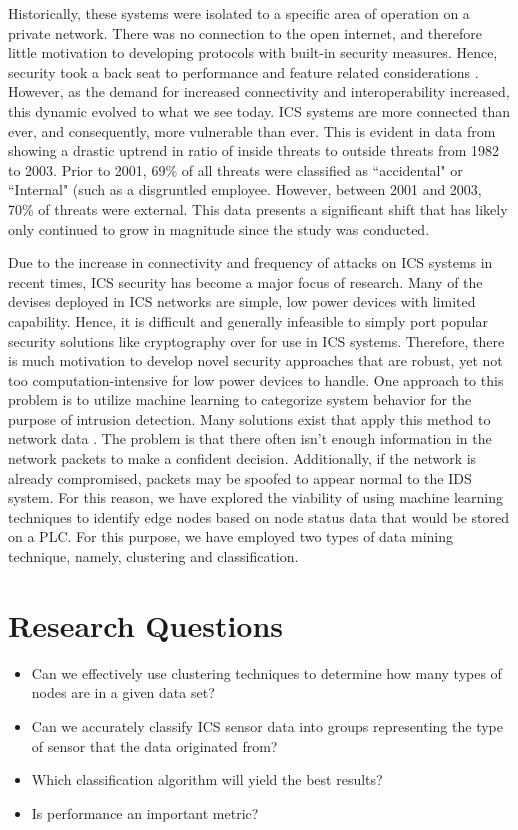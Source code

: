 \documentclass[letterpaper, 10 pt, conference]{ieeeconf}  %
\begin{document}
Historically, these systems were isolated to a specific area of operation on a private network. There was no connection to the open internet, and therefore little motivation to developing protocols with built-in security measures. Hence, security took a back seat to performance and feature related considerations \cite{igure2006security}. However, as the demand for increased connectivity and interoperability increased, this dynamic evolved to what we see today. ICS systems are more connected than ever, and consequently, more vulnerable than ever. This is evident in data from \cite{byres2004myths} showing a drastic uptrend in ratio of inside threats to outside threats from 1982 to 2003. Prior to 2001, 69\% of all threats were classified as ``accidental" or ``Internal" (such as a disgruntled employee. However, between 2001 and 2003, 70\% of threats were external. This data presents a significant shift that has likely only continued to grow in magnitude since the study was conducted.

Due to the increase in connectivity and frequency of attacks on ICS systems in recent times, ICS security has become a major focus of research. Many of the devises deployed in ICS networks are simple, low power devices with limited capability. Hence, it is difficult and generally infeasible to simply port popular security solutions like cryptography over for use in ICS systems. Therefore, there is much motivation to develop novel security approaches that are robust, yet not too computation-intensive for low power devices to handle. 
One approach to this problem is to utilize machine learning to categorize system behavior for the purpose of intrusion detection. Many solutions exist that apply this method to network data \cite{ponomarev2015industrial, schuster2013towards, feng2017multi, terai2017cyber, hijazi2018deep}. The problem is that there often isn't enough information in the network packets to make a confident decision. Additionally, if the network is already compromised, packets may be spoofed to appear normal to the IDS system. For this reason, we have explored the viability of using machine learning techniques to identify edge nodes based on node status data that would be stored on a PLC. For this purpose, we have employed two types of data mining technique, namely, clustering and classification.


\section{Research Questions}
\begin{itemize}
    \item Can we effectively use clustering techniques to determine how many types of nodes are in a given data set?
    \item Can we accurately classify ICS sensor data into groups representing the type of sensor that the data originated from?
    \item Which classification algorithm will yield the best results?
    \item Is performance an important metric?
\end{itemize}
\end{document}

